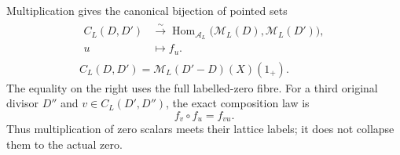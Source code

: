\begin{theorem}\label{SDM:all-morphisms}
Multiplication gives the canonical bijection of pointed sets
\begin{equation}\tag{SDM16}
\begin{gathered}
\begin{aligned}
C_L(D,D')&\xrightarrow{\ \sim\ }
\operatorname{Hom}_{\mathcal A_L}
       \bigl(\mathcal M_L(D),\mathcal M_L(D')\bigr),\\
u&\longmapsto f_u.
\end{aligned}\\
C_L(D,D')=\mathcal M_L(D'-D)(X)(1_+).
\end{gathered}
\end{equation}
The equality on the right uses the full labelled-zero fibre.
For a third original divisor $D''$ and
$v\in C_L(D',D'')$, the exact composition law is
\begin{equation}\tag{SDM17}
f_v\circ f_u=f_{vu}.
\end{equation}
Thus multiplication of zero scalars meets their lattice labels;
it does not collapse them to the actual zero.
\end{theorem}

